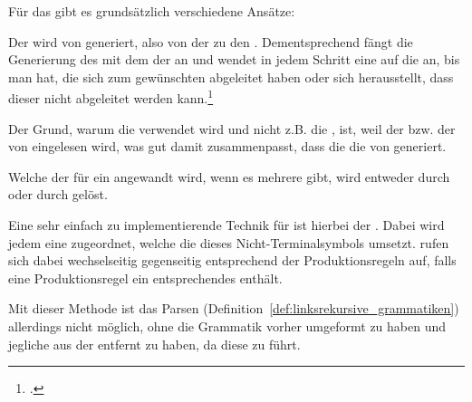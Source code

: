 \begin{Special_Paragraph}
Für das  gibt es grundsätzlich  verschiedene Ansätze:

\begin{itemize}[itemsep=-1mm, topsep=-1mm]
   Der  wird von  generiert, also von der  zu den . Dementsprechend fängt die Generierung des  mit dem  der  an und wendet in jedem Schritt eine  auf die  an, bis man  hat, die sich zum gewünschten  abgeleitet haben oder sich herausstellt, dass dieser nicht abgeleitet werden kann.\footcite{noauthor_what_nodate-2}

  Der Grund, warum die  verwendet wird und nicht z.B. die , ist, weil der  bzw. der  von  eingelesen wird, was gut damit zusammenpasst, dass die  die  von  generiert.

  Welche der  für ein  angewandt wird, wenn es mehrere  gibt, wird entweder durch  oder durch  gelöst.

  Eine sehr einfach zu implementierende Technik für  ist hierbei der . Dabei wird jedem  eine  zugeordnet, welche die  dieses Nicht-Terminalsymbols umsetzt.  rufen sich dabei wechselseitig gegenseitig entsprechend der Produktionsregeln auf, falls eine Produktionsregel ein entsprechendes  enthält.

  Mit dieser Methode ist das Parsen  (Definition~\ref{def:linksrekursive_grammatiken}) allerdings nicht möglich, ohne die Grammatik vorher umgeformt zu haben und jegliche  aus der  entfernt zu haben, da diese zu  führt.


\end{itemize}
\end{Special_Paragraph}
